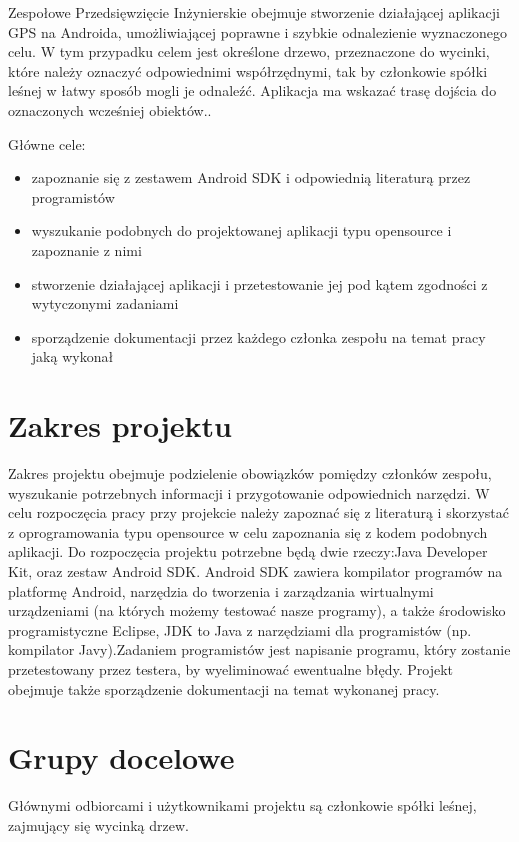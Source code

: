  Zespołowe Przedsięwzięcie Inżynierskie obejmuje stworzenie działającej aplikacji GPS na Androida, umożliwiającej poprawne i szybkie odnalezienie wyznaczonego celu. W tym przypadku celem jest określone drzewo, przeznaczone do wycinki, które należy oznaczyć odpowiednimi współrzędnymi, tak by członkowie spółki leśnej w łatwy sposób mogli je odnaleźć. Aplikacja ma wskazać trasę dojścia do oznaczonych wcześniej  obiektów..
 
 Główne cele:
 \begin{itemize} 
 \item zapoznanie się z zestawem Android SDK i odpowiednią literaturą przez programistów 
 \item wyszukanie podobnych do projektowanej aplikacji typu opensource i zapoznanie z nimi
 \item stworzenie działającej aplikacji i przetestowanie jej pod kątem zgodności z wytyczonymi zadaniami
 \item sporządzenie dokumentacji przez każdego członka zespołu na temat pracy jaką wykonał
 \end{itemize}

\section{Zakres projektu}
Zakres projektu obejmuje podzielenie obowiązków pomiędzy członków zespołu,  wyszukanie potrzebnych informacji i przygotowanie odpowiednich narzędzi. W celu rozpoczęcia pracy przy projekcie należy zapoznać się z literaturą i skorzystać z oprogramowania typu opensource w celu zapoznania się z kodem podobnych aplikacji. Do rozpoczęcia projektu potrzebne będą dwie rzeczy:Java Developer Kit, oraz zestaw Android SDK.  Android SDK zawiera kompilator programów na platformę Android, narzędzia do tworzenia i zarządzania wirtualnymi urządzeniami (na których możemy testować nasze programy), a także środowisko programistyczne Eclipse, JDK to  Java z narzędziami dla programistów (np. kompilator Javy).Zadaniem programistów jest napisanie programu, który zostanie przetestowany przez testera, by wyeliminować ewentualne błędy.
Projekt obejmuje także sporządzenie dokumentacji na temat wykonanej pracy.

\section{Grupy docelowe}

Głównymi odbiorcami i użytkownikami projektu są członkowie spółki leśnej, zajmujący się wycinką drzew.

